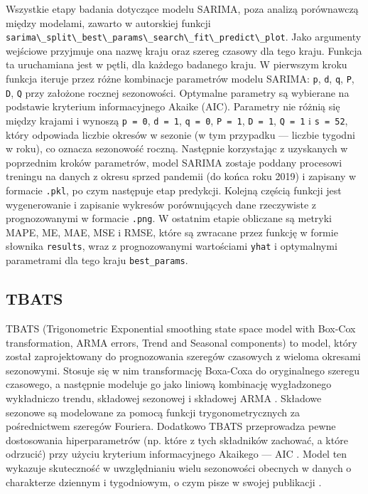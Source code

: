 \documentclass[polish, twoside, 12pt, a4paper]{article}
\theoremstyle{definition}
\theoremstyle{plain}
\theoremstyle{remark}
\newcommand{\code}[1]{\lstinline{#1}}
\begin{document}
Wszystkie etapy badania dotyczące modelu SARIMA, poza analizą porównawczą między modelami, zawarto w autorskiej funkcji \code{sarima\_split\_best\_params\_search\_fit\_predict\_plot}. Jako argumenty wejściowe przyjmuje ona nazwę kraju oraz szereg czasowy dla tego kraju. Funkcja ta uruchamiana jest w pętli, dla każdego badanego kraju. W pierwszym kroku funkcja iteruje przez różne kombinacje parametrów modelu SARIMA: \code{p}, \code{d}, \code{q}, \code{P}, \code{D}, \code{Q} przy założone rocznej sezonowości. Optymalne parametry są wybierane na podstawie kryterium informacyjnego Akaike (AIC). Parametry nie różnią się między krajami i wynoszą \code{p = 0}, \code{d = 1}, \code{q = 0}, \code{P = 1}, \code{D = 1}, \code{Q = 1} i \code{s = 52}, który odpowiada liczbie okresów w sezonie (w tym przypadku --- liczbie tygodni w roku), co oznacza sezonowość roczną. Następnie korzystając z uzyskanych w poprzednim kroków parametrów, model SARIMA zostaje poddany procesowi treningu na danych z okresu sprzed pandemii (do końca roku 2019) i zapisany w formacie \code{.pkl}, po czym następuje etap predykcji. Kolejną częścią funkcji jest wygenerowanie i zapisanie wykresów porównujących dane rzeczywiste z prognozowanymi w formacie \code{.png}. W ostatnim etapie obliczane są metryki MAPE, ME, MAE, MSE i RMSE, które są zwracane przez funkcję w formie słownika \code{results}, wraz z prognozowanymi wartościami \code{yhat} i optymalnymi parametrami dla tego kraju \code{best_params}.
	
\subsection{TBATS}

TBATS (Trigonometric Exponential smoothing state space model with Box-Cox transformation, ARMA errors, Trend and Seasonal components) to model, który został zaprojektowany do prognozowania szeregów czasowych z wieloma okresami sezonowymi. Stosuje się w nim transformację Boxa-Coxa do oryginalnego szeregu czasowego, a następnie modeluje go jako liniową kombinację wygładzonego wykładniczo trendu, składowej sezonowej i składowej ARMA \parencite{delivera2010}. Składowe sezonowe są modelowane za pomocą funkcji trygonometrycznych za pośrednictwem szeregów Fouriera. Dodatkowo TBATS przeprowadza pewne dostosowania hiperparametrów (np. które z tych składników zachować, a które odrzucić) przy użyciu kryterium informacyjnego Akaikego --- AIC \parencite{hyndman2014}. Model ten  wykazuje skuteczność w uwzględnianiu wielu sezonowości obecnych w danych o charakterze dziennym i tygodniowym, o czym pisze w swojej publikacji \cite{montero2020}.
\end{document}
